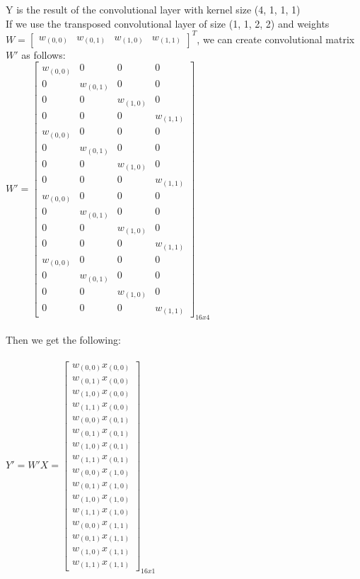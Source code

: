 \documentclass[11pt,english]{article}
\begin{document}
\begin{enumerate}
	Y is the result of the convolutional layer with kernel size (4, 1, 1, 1)\\
	If we use the transposed convolutional layer of size (1, 1, 2, 2) and weights $W = \begin{bmatrix}
	w_{(0, 0)} & w_{(0, 1)} & w_{(1, 0)} & w_{(1, 1)}
	\end{bmatrix}^T$, we can create convolutional matrix $W'$ as follows: \\
	$W' = \begin{bmatrix}
	w_{(0, 0)} & 0 & 0 & 0 \\
	0 & w_{(0, 1)} & 0 & 0 \\
	0 & 0 & w_{(1, 0)} & 0 \\
	0 & 0 & 0 & w_{(1, 1)} \\
	w_{(0, 0)} & 0 & 0 & 0 \\
	0 & w_{(0, 1)} & 0 & 0 \\
	0 & 0 & w_{(1, 0)} & 0 \\
	0 & 0 & 0 & w_{(1, 1)} \\
	w_{(0, 0)} & 0 & 0 & 0 \\
	0 & w_{(0, 1)} & 0 & 0 \\
	0 & 0 & w_{(1, 0)} & 0 \\
	0 & 0 & 0 & w_{(1, 1)} \\
	w_{(0, 0)} & 0 & 0 & 0 \\
	0 & w_{(0, 1)} & 0 & 0 \\
	0 & 0 & w_{(1, 0)} & 0 \\
	0 & 0 & 0 & w_{(1, 1)}
	\end{bmatrix}_{16x4}$\\\\
	Then we get the following:\\\\
	$Y' = W'X = \begin{bmatrix}
	w_{(0, 0)}x_{(0, 0)} \\
	w_{(0, 1)}x_{(0, 0)} \\
	w_{(1, 0)}x_{(0, 0)} \\
	w_{(1, 1)}x_{(0, 0)} \\
	w_{(0, 0)}x_{(0, 1)} \\
	w_{(0, 1)}x_{(0, 1)} \\
	w_{(1, 0)}x_{(0, 1)} \\
	w_{(1, 1)}x_{(0, 1)} \\
	w_{(0, 0)}x_{(1, 0)} \\
	w_{(0, 1)}x_{(1, 0)} \\
	w_{(1, 0)}x_{(1, 0)} \\
	w_{(1, 1)}x_{(1, 0)} \\
	w_{(0, 0)}x_{(1, 1)} \\
	w_{(0, 1)}x_{(1, 1)} \\
	w_{(1, 0)}x_{(1, 1)} \\
	w_{(1, 1)}x_{(1, 1)}
	\end{bmatrix}_{16x1}$\\\\
	

\end{enumerate}
\end{document}
